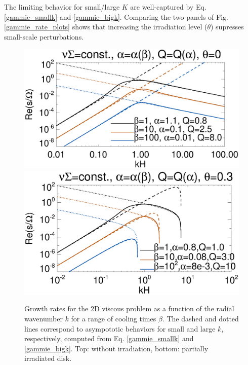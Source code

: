 The limiting behavior for small/large $K$ are
well-captured by Eq. \ref{gammie_smallk} and
\ref{gammie_bigk}. Comparing the two panels of Fig. \ref{gammie_rate_plots} shows that increasing the
irradiation level ($\theta$) supresses small-scale
perturbations. %



\begin{figure}
  \includegraphics[width=\linewidth,clip=true,trim=0cm 1.5cm 0.4cm
    0.0cm]{figures/viscsg_modes}\\
  \includegraphics[width=\linewidth,clip=true,trim=0cm 0cm 0.4cm
    0.0cm]{figures/viscsg_modes_theta0d3}
  \caption{Growth rates for the 2D viscous problem as a function of
    the radial wavenumber $k$ for a range of cooling times
    $\beta$. The dashed and dotted lines correspond to asympototic
    behaviors for small and large $k$, respectively, computed from
    Eq. \ref{gammie_smallk} and \ref{gammie_bigk}. Top: without
    irradiation, bottom: partially irradiated disk. 
    \label{gammie_rate_plot}}
\end{figure}


